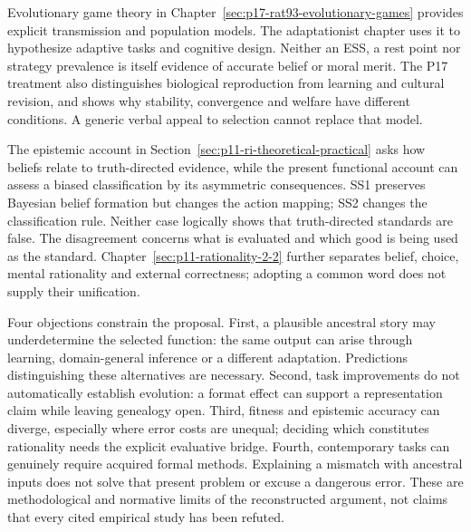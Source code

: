 Evolutionary game theory in
Chapter~\ref{sec:p17-rat93-evolutionary-games} provides explicit
transmission and population models. The adaptationist chapter uses it
to hypothesize adaptive tasks and cognitive design. Neither an ESS,
a rest point nor strategy prevalence is itself evidence of accurate
belief or moral merit. The P17 treatment also distinguishes biological
reproduction from learning and cultural revision, and shows why
stability, convergence and welfare have different conditions. A
generic verbal appeal to selection cannot replace that model.

The epistemic account in
Section~\ref{sec:p11-ri-theoretical-practical} asks how beliefs relate
to truth-directed evidence, while the present functional account can
assess a biased classification by its asymmetric consequences. SS1
preserves Bayesian belief formation but changes the action mapping;
SS2 changes the classification rule. Neither case logically shows
that truth-directed standards are false. The disagreement concerns
what is evaluated and which good is being used as the standard.
Chapter~\ref{sec:p11-rationality-2-2} further separates belief,
choice, mental rationality and external correctness; adopting a common
word does not supply their unification.

Four objections constrain the proposal. First, a plausible ancestral
story may underdetermine the selected function: the same output can
arise through learning, domain-general inference or a different adaptation.
Predictions distinguishing these alternatives are necessary. Second,
task improvements do not automatically establish evolution: a format
effect can support a representation claim while leaving genealogy open.
Third, fitness and epistemic accuracy can diverge, especially where
error costs are unequal; deciding which constitutes rationality needs
the explicit evaluative bridge. Fourth, contemporary tasks can genuinely
require acquired formal methods. Explaining a mismatch with ancestral
inputs does not solve that present problem or excuse a dangerous error.
These are methodological and normative limits of the reconstructed
argument, not claims that every cited empirical study has been refuted.

